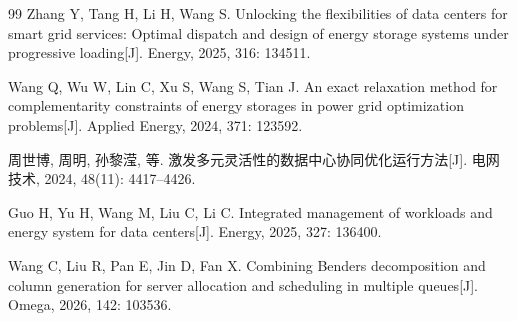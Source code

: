 \begin{thebibliography}{99}
Zhang Y, Tang H, Li H, Wang S. Unlocking the flexibilities of data centers for smart grid services: Optimal dispatch and design of energy storage systems under progressive loading[J]. Energy, 2025, 316: 134511.

Wang Q, Wu W, Lin C, Xu S, Wang S, Tian J. An exact relaxation method for complementarity constraints of energy storages in power grid optimization problems[J]. Applied Energy, 2024, 371: 123592.

周世博, 周明, 孙黎滢, 等. 激发多元灵活性的数据中心协同优化运行方法[J]. 电网技术, 2024, 48(11): 4417--4426.

Guo H, Yu H, Wang M, Liu C, Li C. Integrated management of workloads and energy system for data centers[J]. Energy, 2025, 327: 136400.

Wang C, Liu R, Pan E, Jin D, Fan X. Combining Benders decomposition and column generation for server allocation and scheduling in multiple queues[J]. Omega, 2026, 142: 103536.

\end{thebibliography}
\endgroup
